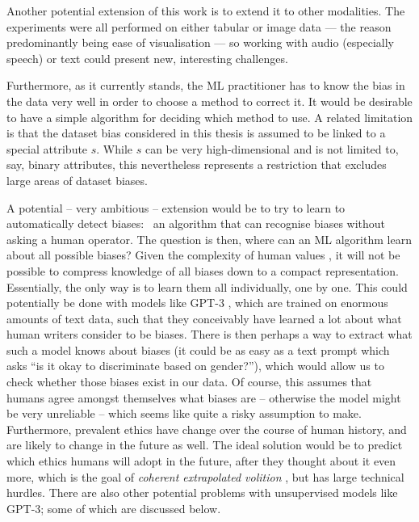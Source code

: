 Another potential extension of this work is to extend it to other modalities. The experiments were
all performed on either tabular or image data --- the reason predominantly being ease of
visualisation --- so working with audio (especially speech) or text could present new, interesting
challenges.

Furthermore, as it currently stands, the \ac{ML} practitioner has to know the bias in the data very
well in order to choose a method to correct it. It would be desirable to have a simple algorithm
for deciding which method to use. A related limitation is that the dataset bias considered in this
thesis is assumed to be linked to a special attribute \(s\). While \(s\) can be very
high-dimensional and is not limited to, say, binary attributes, this nevertheless represents a
restriction that excludes large areas of dataset biases.

A potential -- very ambitious -- extension would be to try to learn to automatically detect biases:
\ie\ an algorithm that can recognise biases without asking a human operator. The question is then,
where can an \ac{ML} algorithm learn about all possible biases? Given the complexity of human
values \citep{yudkowsky2011complex}, it will not be possible to compress knowledge of all biases
down to a compact representation. Essentially, the only way is to learn them all individually, one
by one. This could potentially be done with models like GPT-3 \citep{brown2020language}, which are
trained on enormous amounts of text data, such that they conceivably have learned a lot about what
human writers consider to be biases. There is then perhaps a way to extract what such a model knows
about biases (it could be as easy as a text prompt which asks ``is it okay to discriminate based on
gender?''), which would allow us to check whether those biases exist in our data. Of course, this
assumes that humans agree amongst themselves what biases are -- otherwise the model might be very
unreliable -- which seems like quite a risky assumption to make. Furthermore, prevalent ethics have
change over the course of human history, and are likely to change in the future as well. The ideal
solution would be to predict which ethics humans will adopt in the future, after they thought about
it even more, which is the goal of \emph{coherent extrapolated volition}
\citep{tarleton2010coherent}, but has large technical hurdles. There are also other potential
problems with unsupervised models like GPT-3; some of which are discussed below.

